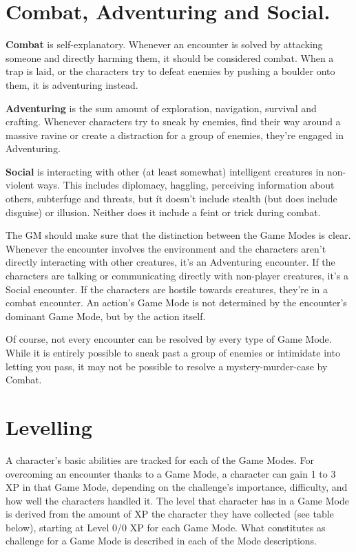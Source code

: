 \section{Combat, Adventuring and Social.}

\textbf{Combat} is self-explanatory. Whenever an encounter is solved by attacking someone and directly harming them, it should be considered combat. When a trap is laid, or the characters try to defeat enemies by pushing a boulder onto them, it is adventuring instead.

\textbf{Adventuring} is the sum amount of exploration, navigation, survival and crafting. Whenever characters try to sneak by enemies, find their way around a massive ravine or create a distraction for a group of enemies, they're engaged in Adventuring.

\textbf{Social} is interacting with other (at least somewhat) intelligent creatures in non-violent ways. This includes diplomacy, haggling, perceiving information about others, subterfuge and threats, but ít doesn't include stealth (but does include disguise) or illusion. Neither does it include a feint or trick during combat.

The GM should make sure that the distinction between the Game Modes is clear. Whenever the encounter involves the environment and the characters aren't directly interacting with other creatures, it's an Adventuring encounter. If the characters are talking or communicating directly with non-player creatures, it's a Social encounter. If the characters are hostile towards creatures, they're in a combat encounter. An action's Game Mode is not determined by the encounter's dominant Game Mode, but by the action itself.

Of course, not every encounter can be resolved by every type of Game Mode. While it is entirely possible to sneak past a group of enemies or intimidate into letting you pass, it may not be possible to resolve a mystery-murder-case by Combat.

\section{Levelling}
A character’s basic abilities are tracked for each of the Game Modes. For overcoming an encounter thanks to a Game Mode, a character can gain 1 to 3 XP in that Game Mode, depending on the challenge’s importance, difficulty, and how well the characters handled it. The level that character has in a Game Mode is derived from the amount of XP the character they have collected (see table below), starting at Level 0/0 XP for each Game Mode. What constitutes as challenge for a Game Mode is described in each of the Mode descriptions.

